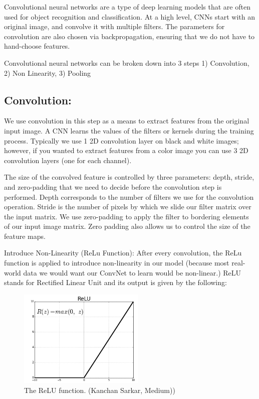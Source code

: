 \documentclass{article}
\begin{document}
Convolutional neural networks are a type of deep learning models that are often used for object recognition and classification. At a high level, CNNs start with an original image, and convolve it with multiple filters. The parameters for convolution are also chosen via backpropagation, ensuring that we do not have to hand-choose features.

Convolutional neural networks can be broken down into 3 steps
1) Convolution, 2) Non Linearity,
3) Pooling

\subsection{Convolution:} We use convolution in this step as a means to extract features from the original input image. A CNN learns the values of the filters or kernels during the training process. Typically we use 1 2D convolution layer on black and white images; however, if you wanted to extract features from a color image you can use 3 2D convolution layers (one for each channel).

The size of the convolved feature is controlled by three parameters: depth, stride, and zero-padding that we need to decide before the convolution step is performed. Depth corresponds to the number of filters we use for the convolution operation. Stride is the number of pixels by which we slide our filter matrix over the input matrix. We use zero-padding to apply the filter to bordering elements of our input image matrix. Zero padding also allows us to control the size of the feature maps. 

Introduce Non-Linearity (ReLu Function):
After every convolution, the ReLu function is applied to introduce non-linearity in our model (because most real-world data we would want our ConvNet to learn would be non-linear.) ReLU stands for Rectified Linear Unit and its output is given by the following:
\begin{figure}[h]
\includegraphics[width=6cm]{relu.png}
\centering
\caption{The ReLU function. (Kanchan Sarkar, Medium))}
\end{figure}
\end{document}
